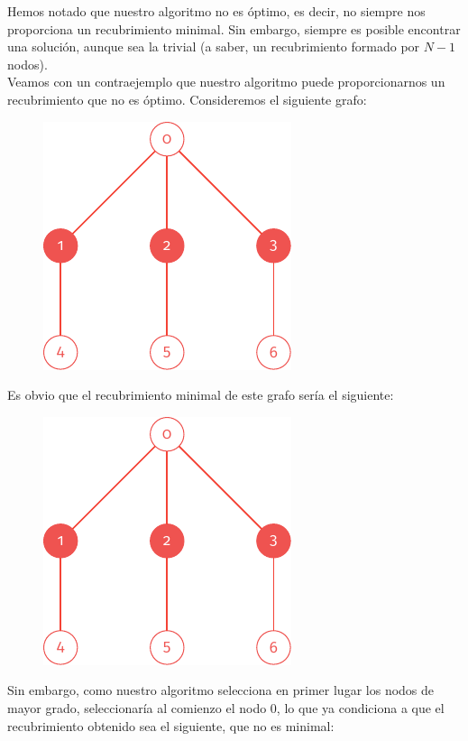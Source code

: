 \documentclass[11pt]{article}
\begin{document}
Hemos notado que nuestro algoritmo no es óptimo, es decir, no siempre nos proporciona un recubrimiento minimal. Sin embargo, siempre es posible encontrar una solución, aunque sea la trivial (a saber, un recubrimiento formado por $N-1$ nodos).\\

Veamos con un contraejemplo que nuestro algoritmo puede proporcionarnos un recubrimiento que no es óptimo. Consideremos el siguiente grafo:

\begin{figure}[H]
	\centering \includegraphics{./img/grafo2.pdf}
\end{figure}

Es obvio que el recubrimiento minimal de este grafo sería el siguiente:

\begin{figure}[H]
	\centering \includegraphics{./img/grafo2-minimal.pdf}
\end{figure}

Sin embargo, como nuestro algoritmo selecciona en primer lugar los nodos de mayor grado, seleccionaría al comienzo el nodo $0$, lo que ya condiciona a que el recubrimiento obtenido sea el siguiente, que no es minimal:
\end{document}
